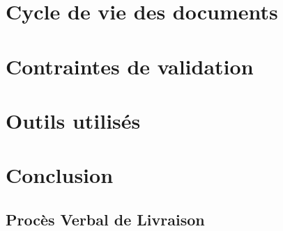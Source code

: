 \part{Cycle de vie des documents}
\setcounter{section}{0}

\part{Contraintes de validation }
\setcounter{section}{0}

\part{Outils utilisés}
\setcounter{section}{0}

\part{Conclusion}
\setcounter{section}{0}


\appendix
\chapter{Procès Verbal de Livraison}




